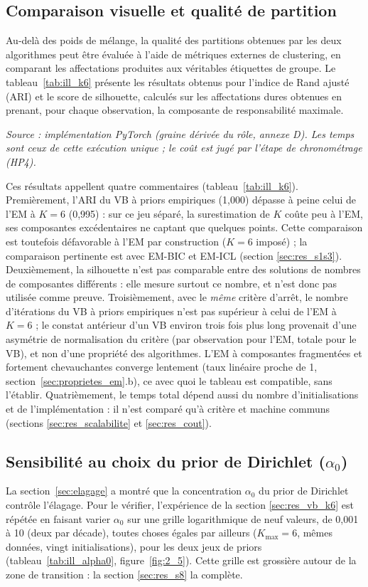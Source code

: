 \subsection{Comparaison visuelle et qualité de partition}\label{sec:res_partition}
Au-delà des poids de mélange, la qualité des partitions obtenues par les deux algorithmes peut être évaluée à l'aide de métriques externes de clustering, en comparant les affectations produites aux véritables étiquettes de groupe. Le tableau~\ref{tab:ill_k6} présente les résultats obtenus pour l'indice de Rand ajusté (ARI) et le score de silhouette, calculés sur les affectations dures obtenues en prenant, pour chaque observation, la composante de responsabilité maximale.

\emph{Source : implémentation PyTorch (graine dérivée du rôle, annexe D). Les temps sont ceux de cette exécution unique ; le coût est jugé par l'étape de chronométrage (HP4).}

Ces résultats appellent quatre commentaires (tableau~\ref{tab:ill_k6}). Premièrement, l'ARI du VB à priors empiriques (1,000) dépasse à peine celui de l'EM à $K=6$ (0,995) : sur ce jeu séparé, la surestimation de $K$ coûte peu à l'EM, ses composantes excédentaires ne captant que quelques points. Cette comparaison est toutefois défavorable à l'EM par construction ($K=6$ imposé) ; la comparaison pertinente est avec EM-BIC et EM-ICL (section \ref{sec:res_s1s3}). Deuxièmement, la silhouette n'est pas comparable entre des solutions de nombres de composantes différents : elle mesure surtout ce nombre, et n'est donc pas utilisée comme preuve. Troisièmement, avec le \emph{même} critère d'arrêt, le nombre d'itérations du VB à priors empiriques n'est pas supérieur à celui de l'EM à $K=6$ ; le constat antérieur d'un VB environ trois fois plus long provenait d'une asymétrie de normalisation du critère (par observation pour l'EM, totale pour le VB), et non d'une propriété des algorithmes. L'EM à composantes fragmentées et fortement chevauchantes converge lentement (taux linéaire proche de 1, section~\ref{sec:proprietes_em}.b), ce avec quoi le tableau est compatible, sans l'établir. Quatrièmement, le temps total dépend aussi du nombre d'initialisations et de l'implémentation : il n'est comparé qu'à critère et machine communs (sections \ref{sec:res_scalabilite} et \ref{sec:res_cout}).

\subsection{Sensibilité au choix du prior de Dirichlet ($\alpha _{0}$)}\label{sec:res_alpha0}
La section~\ref{sec:elagage} a montré que la concentration $\alpha_0$ du prior de Dirichlet contrôle l'élagage. Pour le vérifier, l'expérience de la section \ref{sec:res_vb_k6} est répétée en faisant varier $\alpha_0$ sur une grille logarithmique de neuf valeurs, de 0,001 à 10 (deux par décade), toutes choses égales par ailleurs ($K_{\max}=6$, mêmes données, vingt initialisations), pour les deux jeux de priors (tableau~\ref{tab:ill_alpha0}, figure~\ref{fig:2_5}). Cette grille est grossière autour de la zone de transition : la section \ref{sec:res_s8} la complète.

